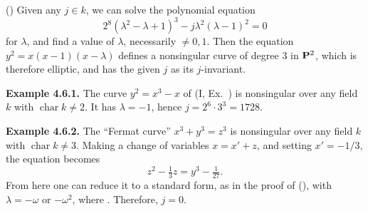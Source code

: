 {() Given any $j\in k$, we can solve the polynomial equation
\[
2^8(\lambda^2-\lambda+1)^3-j\lambda^2(\lambda-1)^2=0
\]
\noindent for $\lambda$, and find a value of $\lambda$, necessarily $\ne0,1$. Then the equation $y^2=x(x-1)(x-\lambda)$ defines a nonsingular curve of degree $3$ in $\mathbf{P}^2$, which is therefore elliptic, and has the given $j$ as its $j$-invariant.

\medskip
\noindent\hypertarget{result-IV-4.6.1}{}\textbf{Example 4.6.1.} The curve $y^2=x^3-x$ of (I, Ex.~) is nonsingular over any field $k$ with $\operatorname{char}k\ne2$. It has $\lambda=-1$, hence $j=2^6\cdot3^3=1728$.

\medskip
\noindent\hypertarget{result-IV-4.6.2}{}\textbf{Example 4.6.2.} The \textquotedblleft{}Fermat curve\textquotedblright{} $x^3+y^3=z^3$ is nonsingular over any field $k$ with $\operatorname{char}k\ne3$. Making a change of variables $x=x'+z$, and setting $x'=-1/3$, the equation becomes
\[
z^2-\tfrac13z=y^3-\tfrac1{27}.
\]
\noindent From here one can reduce it to a standard form, as in the proof of (), with $\lambda=-\omega$ or $-\omega^2$, where . Therefore, $j=0$.
}
